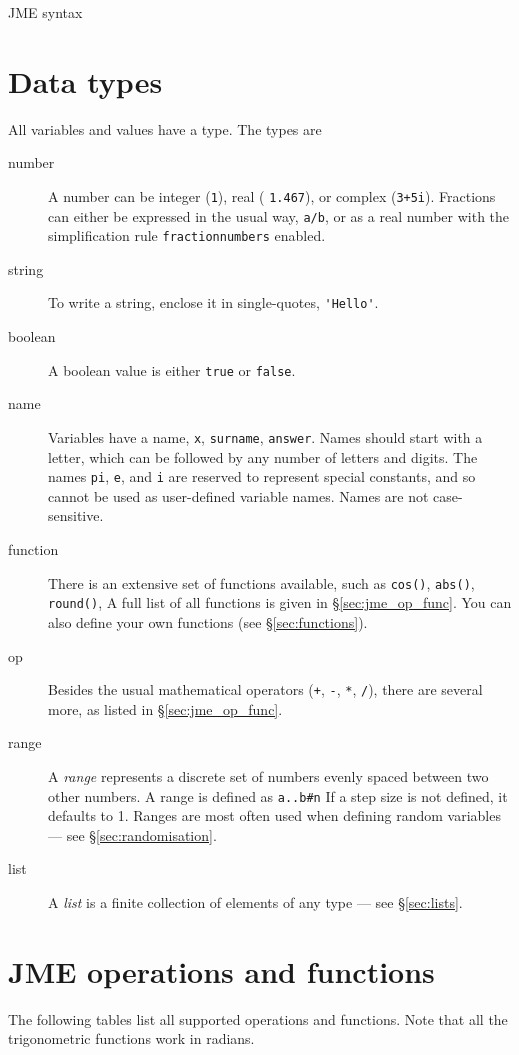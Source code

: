 \begin{chapter}{\label{cha:jme_syntax}JME syntax}
  \section{\label{sec:jme_data_types}Data types}
  All variables and values have a type.  The types are
  \begin{description}
    \item[number] A number can be integer (\eg \verb"1"), real (\eg
      \verb"1.467"), or complex (\eg \verb"3+5i").  Fractions can either be
      expressed in the usual way, \eg \verb"a/b", or as a real number with the
      simplification rule \verb"fractionnumbers" enabled.
    \item[string] To write a string, enclose it in single-quotes, \eg
      \verb"'Hello'".
    \item[boolean] A boolean value is either \verb"true" or \verb"false".
    \item[name] Variables have a name, \eg \verb"x", \verb"surname",
      \verb"answer".  Names should start with a letter, which can be followed
      by any number of letters and digits.  The names \verb"pi", \verb"e", and
      \verb"i" are reserved to represent special constants, and so cannot be
      used as user-defined variable names. Names are not case-sensitive.
    \item[function] There is an extensive set of functions available, such as
      \verb"cos()", \verb"abs()", \verb"round()", \etc  A full list of all
      functions is given in \S\ref{sec:jme_op_func}.  You can also define
      your own functions (see \S\ref{sec:functions}).
    \item[op] Besides the usual mathematical operators (\verb"+", \verb"-",
      \verb"*", \verb"/"), there are several more, as listed in
      \S\ref{sec:jme_op_func}.
    \item[range] A \emph{range} represents a discrete set of numbers evenly
      spaced between two other numbers.  A range is defined as \verb"a..b#n" If
      a step size is not defined, it defaults to 1.  Ranges are most often used
      when defining random variables --- see \S\ref{sec:randomisation}.
    \item[list] A \emph{list} is a finite collection of elements of any type
      --- see \S\ref{sec:lists}.
  \end{description}

  \section{\label{sec:jme_op_func}JME operations and functions}
  The following tables list all supported operations and functions. Note that
  all the trigonometric functions work in radians.


\end{chapter}
